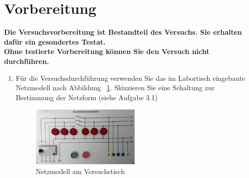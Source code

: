 \section{Vorbereitung}
\textbf{Die Versuchsvorbereitung ist Bestandteil des Versuchs. Sie erhalten dafür ein gesondertes Testat.\\
Ohne testierte Vorbereitung können Sie den Versuch nicht durchführen.}\\
\begin{enumerate}[label=\alph*)]
  \item Für die Versuchsdurchführung verwenden Sie das im Labortisch eingebaute Netzmodell nach Abbildung ~\ref{img2.1.1}. Skizzieren Sie eine Schaltung zur Bestimmung der Netzform (siehe Aufgabe 3.1) 
    \begin{figure}[h!]
      \begin{center}
        \includegraphics[width=0.5\textwidth]{img/img2.1.1.png}
      \end{center}
      \caption{Netzmodell am Versuchstisch }\label{img2.1.1}
    \end{figure}
    

\end{enumerate}
